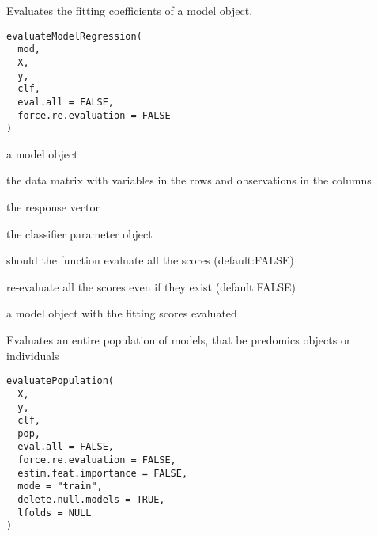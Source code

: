 \documentclass[a4paper]{book}
\begin{document}
%
\begin{Description}
Evaluates the fitting coefficients of a model object.
\end{Description}
%
\begin{Usage}
\begin{verbatim}
evaluateModelRegression(
  mod,
  X,
  y,
  clf,
  eval.all = FALSE,
  force.re.evaluation = FALSE
)
\end{verbatim}
\end{Usage}
%
\begin{Arguments}
\begin{ldescription}
\item[\code{mod:}] a model object

\item[\code{X:}] the data matrix with variables in the rows and observations in the columns

\item[\code{y:}] the response vector

\item[\code{clf:}] the classifier parameter object

\item[\code{eval.all:}] should the function evaluate all the scores (default:FALSE)

\item[\code{force.re.evaluation:}] re-evaluate all the scores even if they exist (default:FALSE)
\end{ldescription}
\end{Arguments}
%
\begin{Value}
a model object with the fitting scores evaluated
\end{Value}
%
\begin{Description}
Evaluates an entire population of models, that be predomics objects or individuals
\end{Description}
%
\begin{Usage}
\begin{verbatim}
evaluatePopulation(
  X,
  y,
  clf,
  pop,
  eval.all = FALSE,
  force.re.evaluation = FALSE,
  estim.feat.importance = FALSE,
  mode = "train",
  delete.null.models = TRUE,
  lfolds = NULL
)
\end{verbatim}
\end{Usage}
%
\end{document}
